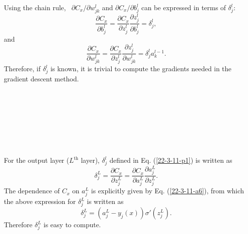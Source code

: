 \documentclass{article}
\newcommand{\tmop}[1]{\ensuremath{\operatorname{#1}}}
\begin{document}
Using the chain rule, \ $\partial C_x / \partial w^l_{j k}$ and $\partial C_x
/ \partial b^l_j$ can be expressed in terms of $\delta^l_j$:
\begin{equation}
  \frac{\partial C_x}{\partial b_j^l} = \frac{\partial C_x}{\partial z_j^l} 
  \frac{\partial z^l_j}{\partial b_j^l} = \delta^l_j,
\end{equation}
and
\begin{equation}
  \frac{\partial C_x}{\partial w_{j k}^l} = \frac{\partial C_x}{\partial
  z_j^l}  \frac{\partial z^l_j}{\partial w_{j k}^l} = \delta^l_j a_k^{l - 1} .
\end{equation}
Therefore, if $\delta^l_j$ is known, it is trivial to compute the gradients
needed in the gradient descent method.



\


\

\

\

For the output layer ($L^{\tmop{th}}$ layer), $\delta^l_j$ defined in Eq.
(\ref{22-3-11-p1}) is written as
\begin{equation}
  \delta^L_j = \frac{\partial C_x}{\partial z_j^L} = \frac{\partial
  C_x}{\partial a^L_j}  \frac{\partial a^L_j}{\partial z_j^L} .
\end{equation}
The dependence of $C_x$ on $a_j^L$ is explicitly given by Eq.
(\ref{22-3-11-a6}), from which the above expression for $\delta_j^L$ is
written as
\begin{equation}
  \delta^L_j = (a^L_j - y_j (x)) \sigma' (z_j^L) .
\end{equation}
Therefore $\delta^L_j$ is easy to compute.
\end{document}
